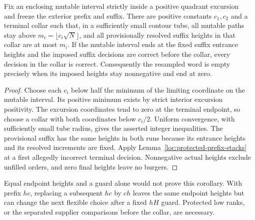 \begin{corollary}
\label{loc:terminal-flexible-orders}
Fix an enclosing mutable interval strictly inside a positive quadrant
excursion and freeze the exterior prefix and suffix.  There are positive
constants $c_1,c_2$ and a terminal collar such that, in a sufficiently
small contour tube, all mutable paths stay above
$m_i=\lfloor c_i\sqrt N\rfloor$, and all provisionally resolved suffix
heights in that collar are at most $m_i$.  If the mutable interval ends
at the fixed suffix entrance heights and the imposed suffix decisions
are correct before the collar, every decision in the collar is correct.
Consequently the resampled word is empty precisely when its imposed
heights stay nonnegative and end at zero.
\end{corollary}
\begin{proof}
Choose each $c_i$ below half the minimum of the limiting coordinate on
the mutable interval.  Its positive minimum exists by strict interior
excursion positivity.  The excursion coordinates tend to zero at the
terminal endpoint, so choose a collar with both coordinates below
$c_i/2$.  Uniform convergence, with sufficiently small tube radius,
gives the asserted integer inequalities.  The provisional suffix has
the same heights in both runs because its entrance heights and its
resolved increments are fixed.  Apply
Lemma~\ref{loc:protected-prefix-stacks} at a first allegedly incorrect
terminal decision.  Nonnegative actual heights exclude unfilled orders,
and zero final heights leave no burgers.
\end{proof}

\begin{remark}
Equal endpoint heights and a guard alone would not prove this
corollary.  With prefix $hc$, replacing a subsequent $hc$ by $ch$ leaves
the same endpoint heights but can change the next flexible choice after
a fixed $hH$ guard.  Protected low ranks, or the separated supplier
comparisons before the collar, are necessary.
\end{remark}

